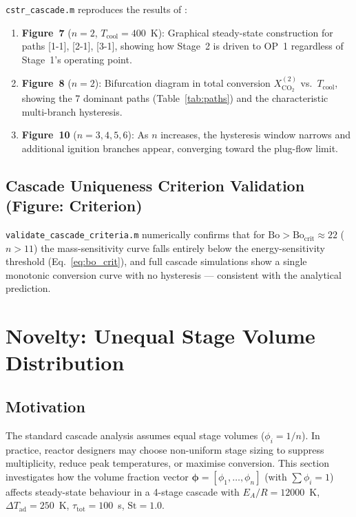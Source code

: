 \documentclass[11pt,a4paper]{article}
\newcommand{\dTad}{\Delta T_{\mathrm{ad}}}
\newcommand{\Xco}{X_{\mathrm{CO_2}}}
\newcommand{\Tcool}{T_{\mathrm{cool}}}
\newcommand{\St}{\mathrm{St}}
\newcommand{\Bo}{\mathrm{Bo}}
\begin{document}
\texttt{cstr\_cascade.m} reproduces the results of \cite{bremer2021}:

\begin{enumerate}[leftmargin=1.6em,itemsep=1pt]
  \item \textbf{Figure~7} ($n=2$, $\Tcool=400$~K): Graphical steady-state
        construction for paths [1-1], [2-1], [3-1], showing how Stage~2 is
        driven to OP~1 regardless of Stage~1's operating point.
  \item \textbf{Figure~8} ($n=2$): Bifurcation diagram in total conversion
        $\Xco^{(2)}$ vs.\ $\Tcool$, showing the 7 dominant paths
        (Table~\ref{tab:paths}) and the characteristic multi-branch hysteresis.
  \item \textbf{Figure~10} ($n=3,4,5,6$): As $n$ increases, the hysteresis
        window narrows and additional ignition branches appear, converging toward
        the plug-flow limit.
\end{enumerate}

\subsection{Cascade Uniqueness Criterion Validation (Figure: Criterion)}

\texttt{validate\_cascade\_criteria.m} numerically confirms that for
$\Bo > \Bo_\mathrm{crit} \approx 22$ ($n > 11$) the mass-sensitivity curve
falls entirely below the energy-sensitivity threshold (Eq.~\eqref{eq:bo_crit}),
and full cascade simulations show a single monotonic conversion curve with
no hysteresis — consistent with the analytical prediction.

\section{Novelty: Unequal Stage Volume Distribution}
\label{sec:novelty}

\subsection{Motivation}

The standard cascade analysis assumes equal stage volumes ($\phi_i = 1/n$).
In practice, reactor designers may choose non-uniform stage sizing to suppress
multiplicity, reduce peak temperatures, or maximise conversion.
This section investigates how the volume fraction vector
$\bm{\phi}=[\phi_1,\ldots,\phi_n]$ (with $\sum\phi_i=1$) affects
steady-state behaviour in a 4-stage cascade with
$E_A/R=12000$~K, $\dTad=250$~K, $\tau_\mathrm{tot}=100$~s, $\St=1.0$.
\end{document}
